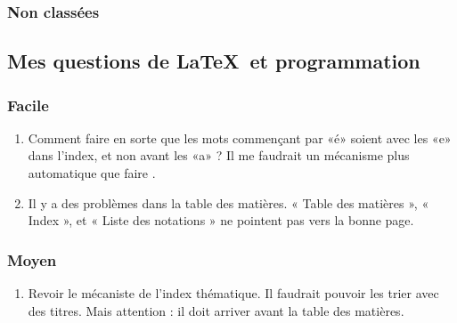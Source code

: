 \subsubsection{Non classées}

\subsection{Mes questions de \LaTeX\ et programmation}

\subsubsection{Facile}

\begin{enumerate}
    \item
        Comment faire en sorte que les mots commençant par «é» soient avec les «e» dans l'index, et non avant les «a» ? Il me faudrait un mécanisme plus automatique que faire .
    \item 
        Il y a des problèmes dans la table des matières.  « Table des matières », « Index », et « Liste des notations » ne pointent pas vers la bonne page.
\end{enumerate}

\subsubsection{Moyen}

\begin{enumerate}
    \item
        Revoir le mécaniste de l'index thématique. Il faudrait pouvoir les trier avec des titres. Mais attention : il doit arriver avant la table des matières.
\end{enumerate}

